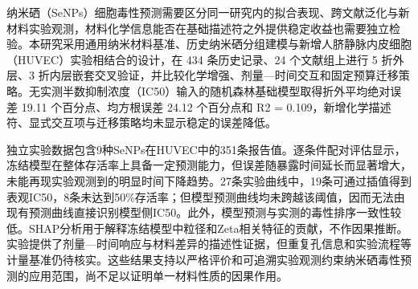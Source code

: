 纳米硒（SeNPs）细胞毒性预测需要区分同一研究内的拟合表现、跨文献泛化与新材料实验观测，材料化学信息能否在基础描述符之外提供稳定收益也需要独立检验。本研究采用通用纳米材料基准、历史纳米硒分组建模与新增人脐静脉内皮细胞（HUVEC）实验相结合的设计，在 434 条历史记录、24 个文献组上进行 5 折外层、3 折内层嵌套交叉验证，并比较化学增强、剂量—时间交互和固定预算迁移策略。无实测半数抑制浓度（IC50）输入的随机森林基础模型取得折外平均绝对误差 19.11 个百分点、均方根误差 24.12 个百分点和 R2 = 0.109，新增化学描述符、显式交互项与迁移策略均未显示稳定的误差降低。

独立实验数据包含9种SeNPs在HUVEC中的351条报告值。逐条件配对评估显示，冻结模型在整体存活率上具备一定预测能力，但误差随暴露时间延长而显著增大，未能再现实验观测到的明显时间下降趋势。27条实验曲线中，19条可通过插值得到表观\nobreakspace{}IC50，8条未达到50\%存活率；但模型预测曲线均未跨越该阈值，因而无法由现有预测曲线直接识别模型侧\nobreakspace{}IC50。此外，模型预测与实测的毒性排序一致性较低。SHAP分析用于解释冻结模型中粒径和Zeta相关特征的贡献，不作因果推断。实验提供了剂量—时间响应与材料差异的描述性证据，但重复孔信息和实验流程等计量基准仍待核实。这些结果支持以严格评价和可追溯实验观测约束纳米硒毒性预测的应用范围，尚不足以证明单一材料性质的因果作用。
